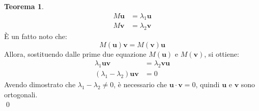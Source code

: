 \documentclass[10pt,a4paper]{article}
\theoremstyle{plain}
\theoremstyle{definition}
\newtheorem{teorema}[subsection]{Teorema}
\begin{document}
\begin{teorema}
\begin{align*}
M\mathbf{u}&=\lambda_1 \mathbf{u} \\
M\mathbf{v}&=\lambda_2 \mathbf{v} 
\end{align*}
È un fatto noto che:
\[
M(\mathbf{u})\mathbf{v}=M(\mathbf{v})\mathbf{u}
\]
Allora, sostituendo dalle prime due equazione $M(\mathbf{u})$ e $M(\mathbf{v})$, si ottiene:
\begin{align*}
\lambda_1 \mathbf{u} \mathbf{v} &= \lambda_2 \mathbf{v}\mathbf{u} \\
(\lambda_1 - \lambda_2)\mathbf{u}\mathbf{v} &=0
\end{align*}
Avendo dimostrato che 
$\lambda_1 - \lambda_2 \ne 0$, è necessario che $\mathbf{u}\cdot\mathbf{v}=0$, quindi $\mathbf{u}$ e $\mathbf{v}$ sono ortogonali.\\ \qed
\end{teorema}
\end{document}
